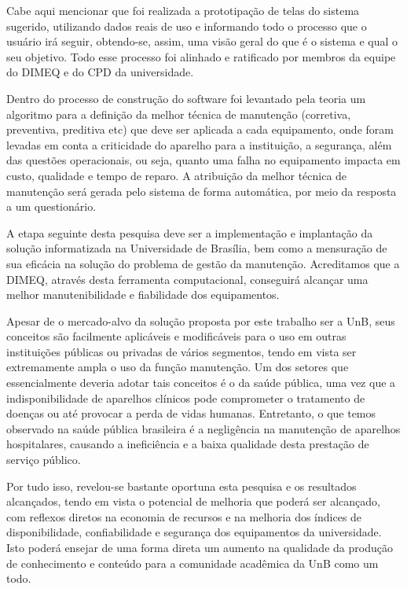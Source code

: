 Cabe aqui mencionar que foi realizada a prototipação de telas do sistema sugerido, utilizando dados reais de uso e informando todo o processo que o usuário irá seguir, obtendo-se, assim, uma visão geral do que é o sistema e qual o seu objetivo. Todo esse processo foi alinhado e ratificado por membros da equipe do DIMEQ e do CPD da universidade.

Dentro do processo de construção do software foi levantado pela teoria um algoritmo para a definição da melhor técnica de manutenção (corretiva, preventiva, preditiva etc) que deve ser aplicada a cada equipamento, onde foram levadas em conta a criticidade do aparelho para a instituição, a segurança, além das questões operacionais, ou seja, quanto uma falha no equipamento impacta em custo, qualidade e tempo de reparo. A atribuição da melhor técnica de manutenção será gerada pelo sistema de forma automática, por meio da resposta a um questionário.

A etapa seguinte desta pesquisa deve ser a implementação e implantação da solução informatizada na Universidade de Brasília, bem como a mensuração de sua eficácia na solução do problema de gestão da manutenção. Acreditamos que a DIMEQ, através desta ferramenta computacional, conseguirá alcançar uma melhor manutenibilidade e fiabilidade dos equipamentos.

Apesar de o mercado-alvo da solução proposta por este trabalho ser a UnB, seus conceitos são facilmente aplicáveis e modificáveis para o uso em outras instituições públicas ou privadas de vários segmentos, tendo em vista ser extremamente ampla o uso da função manutenção. Um dos setores que essencialmente deveria adotar tais conceitos é o da saúde pública, uma vez que a indisponibilidade de aparelhos clínicos pode comprometer o tratamento de doenças ou até provocar a perda de vidas humanas. Entretanto, o que temos observado na saúde pública brasileira é a negligência na manutenção de aparelhos hospitalares, causando a ineficiência e a baixa qualidade desta prestação de serviço público.

Por tudo isso, revelou-se bastante oportuna esta pesquisa e os resultados alcançados, tendo em vista o potencial de melhoria que poderá ser alcançado, com reflexos diretos na economia de recursos e na melhoria dos índices de disponibilidade, confiabilidade e segurança dos equipamentos da universidade. Isto poderá ensejar de uma forma direta um aumento na qualidade da produção de conhecimento e conteúdo para a comunidade acadêmica da UnB como um todo.


